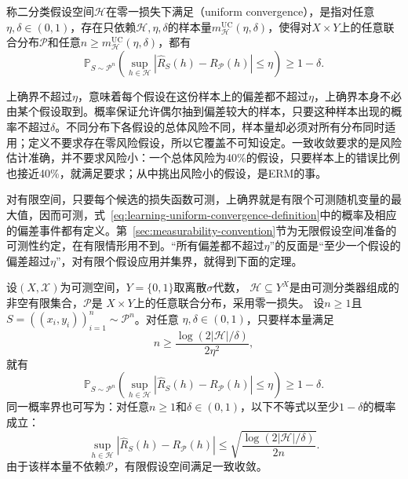 \begin{definition}[一致收敛]
\label{def:learning-uniform-convergence}
称二分类假设空间$\mathcal H$在零一损失下满足（uniform convergence），是指对任意$\eta,\delta\in(0,1)$，存在只依赖$\mathcal H,\eta,\delta$的样本量$m_{\mathcal H}^{\mathrm{UC}}(\eta,\delta)$，使得对$X\times Y$上的任意联合分布$\mathcal P$和任意$n\geq m_{\mathcal H}^{\mathrm{UC}}(\eta,\delta)$，都有
\begin{equation}
 \mathbb P_{S\sim\mathcal P^n}\left(
   \sup_{h\in\mathcal H}|\hat R_S(h)-R_{\mathcal P}(h)|\leq\eta
 \right)\geq1-\delta.
 \label{eq:learning-uniform-convergence-definition}
\end{equation}
\end{definition}

上确界不超过$\eta$，意味着每个假设在这份样本上的偏差都不超过$\eta$，上确界本身不必由某个假设取到。概率保证允许偶尔抽到偏差较大的样本，只要这种样本出现的概率不超过$\delta$。不同分布下各假设的总体风险不同，样本量却必须对所有分布同时适用；定义不要求存在零风险假设，所以它覆盖不可知设定。一致收敛要求的是风险估计准确，并不要求风险小：一个总体风险为40\%的假设，只要样本上的错误比例也接近40\%，就满足要求；从中挑出风险小的假设，是ERM的事。

对有限空间，只要每个候选的损失函数可测，上确界就是有限个可测随机变量的最大值，因而可测，式~\eqref{eq:learning-uniform-convergence-definition}中的概率及相应的偏差事件都有定义。第~\ref{sec:measurability-convention}节为无限假设空间准备的可测性约定，在有限情形用不到。“所有偏差都不超过$\eta$”的反面是“至少一个假设的偏差超过$\eta$”，对有限个假设应用并集界，就得到下面的定理。

\begin{theorem}[有限假设空间的一致收敛样本量界]
\label{thm:finite-uniform-convergence}
设$(X,\mathcal X)$为可测空间，$Y=\{0,1\}$取离散$\sigma$代数，
$\mathcal H\subseteq Y^X$是由可测分类器组成的非空有限集合，$\mathcal P$是
$X\times Y$上的任意联合分布，采用零一损失。
设$n\geq1$且$S=((x_i,y_i))_{i=1}^n\sim\mathcal P^n$。对任意
$\eta,\delta\in(0,1)$，只要样本量满足
\begin{equation}
 n\geq\frac{\log(2|\mathcal H|/\delta)}{2\eta^2},
 \label{eq:finite-uniform-sample}
\end{equation}
就有
\[
 \mathbb P_{S\sim\mathcal P^n}\left(
 \sup_{h\in\mathcal H}|\hat R_S(h)-R_{\mathcal P}(h)|\leq\eta
 \right)\geq1-\delta.
\]
同一概率界也可写为：对任意$n\geq1$和$\delta\in(0,1)$，以下不等式以至少$1-\delta$的概率成立：
\begin{equation}
 \sup_{h\in\mathcal H}|\hat R_S(h)-R_{\mathcal P}(h)|
 \leq\sqrt{\frac{\log(2|\mathcal H|/\delta)}{2n}}.
 \label{eq:finite-uniform-bound}
\end{equation}
由于该样本量不依赖$\mathcal P$，有限假设空间满足一致收敛。
\end{theorem}

